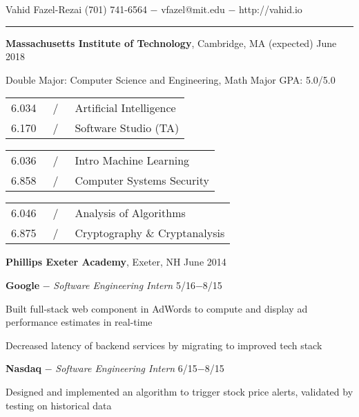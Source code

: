\documentclass[11pt]{article}
\newcommand{\msection}[1]{\vspace{1em}\marginnote{#1}} %
\newcommand{\bt}[1]{\textbf{#1}} %
\newcommand{\gap}[0]{\vspace{0.6em}} %
\newcommand{\dash}[0]{ $-$ } %
\newcommand{\tabsep}[0]{\, / \,} %
\begin{document}

{\Huge Vahid Fazel-Rezai} \hfill  (701) 741-6564\dash vfazel@mit.edu\dash http://vahid.io

\vspace{0.4em}

\hspace{-1.2in}\rule{7.9in}{0.2em}

\vspace{-0.2em}



\msection{Education}

\bt{Massachusetts Institute of Technology}, Cambridge, MA \hfill (expected) June 2018

Double Major: Computer Science and Engineering, Math \hfill Major GPA: 5.0/5.0

\vspace{0.15em}\begin{tabular}{rcl}
6.034 & \tabsep & Artificial Intelligence \\
6.170 & \tabsep & Software Studio (TA)
\end{tabular}
\hfill
\begin{tabular}{rcl}
6.036 & \tabsep & Intro Machine Learning \\
6.858 & \tabsep & Computer Systems Security
\end{tabular}
\hfill
\begin{tabular}{rcl}
6.046 & \tabsep & Analysis of Algorithms \\
6.875 & \tabsep & Cryptography \& Cryptanalysis
\end{tabular}

\gap

\bt{Phillips Exeter Academy}, Exeter, NH \hfill June 2014



\msection{Work}

\bt{Google}\dash \emph{Software Engineering Intern} \hfill 5/16$-$8/15

Built full-stack web component in AdWords to compute and display ad performance estimates in real-time

Decreased latency of backend services by migrating to improved tech stack

\gap

\bt{Nasdaq}\dash \emph{Software Engineering Intern} \hfill 6/15$-$8/15

Designed and implemented an algorithm to trigger stock price alerts, validated by testing on historical data
\end{document}
